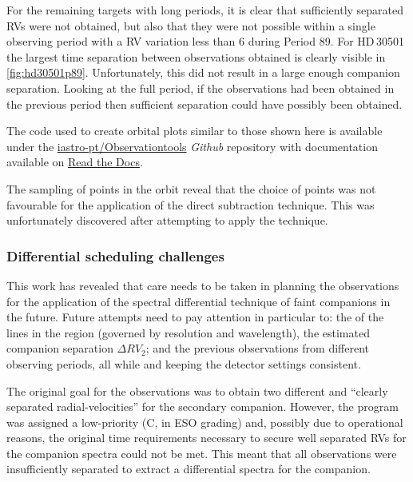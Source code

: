For the remaining targets with long periods, it is clear that sufficiently separated {RV}s were not obtained, but also that they were not possible within a single observing period with a RV variation less than 6\kmps{} during Period 89.
For HD\,30501 the largest time separation between observations obtained is clearly visible in \cref{fig:hd30501p89}.
Unfortunately, this did not result in a large enough companion separation.
Looking at the full period, if the observations had been obtained in the previous period then sufficient separation could have possibly been obtained.

The code used to create orbital plots similar to those shown here is available under the \href{https://github.com/iastro-pt/ObservationTools}{iastro-pt/Observationtools} \emph{Github} repository with documentation available on \href{https://ia-observationtools.readthedocs.io/en/latest/rv.html}{Read the Docs}.


The sampling of points in the orbit reveal that the choice of points was not favourable for the application of the direct subtraction technique.
This was unfortunately discovered after attempting to apply the technique.





\subsubsection{Differential scheduling challenges}
\label{subsubsec:differential-schedualing}
This work has revealed that care needs to be taken in planning the observations for the application of the spectral differential technique of faint companions in the future.
Future attempts need to pay attention in particular to: the {\fwhm} of the lines in the region (governed by resolution and wavelength), the estimated companion separation \(\Delta {RV}_2\); and the previous observations from different observing periods, all while and keeping the detector settings consistent.

The original goal for the observations was to obtain two different and ``clearly separated radial-velocities'' for the secondary companion.
However, the program was assigned a low-priority (C, in {ESO} grading) and, possibly due to operational reasons, the original time requirements necessary to secure well separated {RV}s for the companion spectra could not be met.
This meant that all observations were insufficiently separated to extract a differential spectra for the companion.

